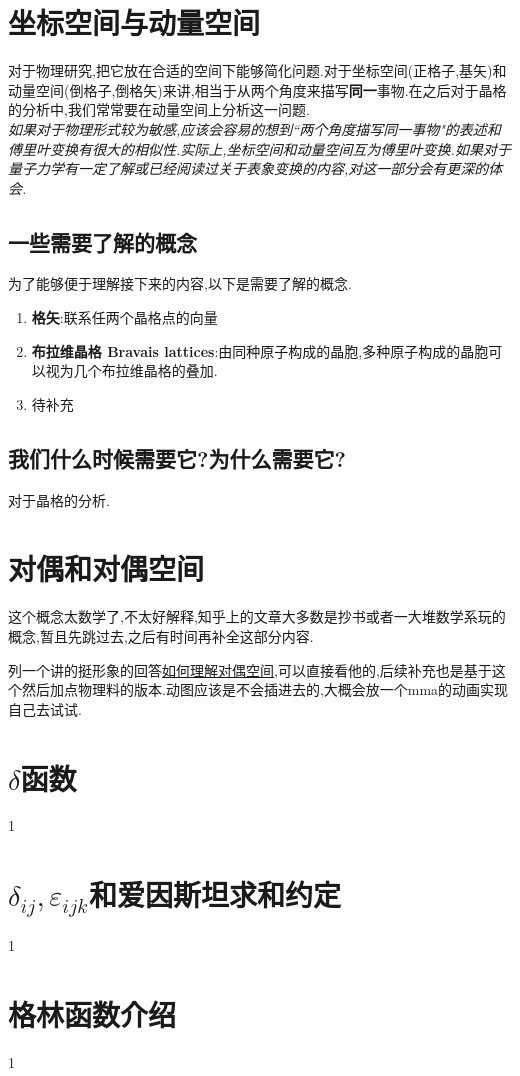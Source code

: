 \documentclass[lang=cn,newtx,10pt,scheme=chinese,thmcnt=section]{elegantbook}
\begin{document}
\chapter{坐标空间与动量空间}
对于物理研究,把它放在合适的空间下能够简化问题.对于坐标空间(正格子,基矢)和动量空间(倒格子,倒格矢)来讲,相当于从两个角度来描写\textbf{同一}事物.在之后对于晶格的分析中,我们常常要在动量空间上分析这一问题.\\
\textit{如果对于物理形式较为敏感,应该会容易的想到``两个角度描写同一事物"的表述和傅里叶变换有很大的相似性.实际上,坐标空间和动量空间互为傅里叶变换.如果对于量子力学有一定了解或已经阅读过关于表象变换的内容,对这一部分会有更深的体会.}
\section*{一些需要了解的概念}
为了能够便于理解接下来的内容,以下是需要了解的概念.
\begin{enumerate}
	\item \textbf{格矢}:联系任两个晶格点的向量
	\item \textbf{布拉维晶格 Bravais lattices}:由同种原子构成的晶胞,多种原子构成的晶胞可以视为几个布拉维晶格的叠加.
	\item 待补充
\end{enumerate}
\section*{我们什么时候需要它?为什么需要它?}
对于晶格的分析.
\chapter{对偶和对偶空间}
这个概念太数学了,不太好解释,知乎上的文章大多数是抄书或者一大堆数学系玩的概念,暂且先跳过去,之后有时间再补全这部分内容.

列一个讲的挺形象的回答\href{https://www.zhihu.com/question/38464481/answer/23567212}{如何理解对偶空间},可以直接看他的,后续补充也是基于这个然后加点物理料的版本.动图应该是不会插进去的,大概会放一个mma的动画实现自己去试试.
\chapter{$\delta$函数}
1
\chapter{$\delta_{ij},\varepsilon_{ijk}$和爱因斯坦求和约定}
1
\chapter{格林函数介绍}
1
\end{document}
